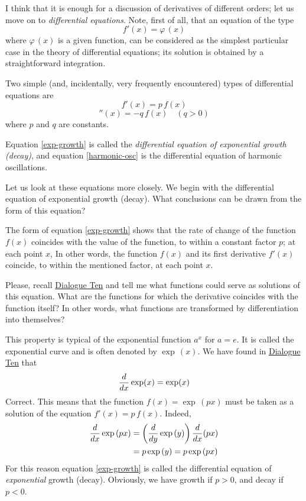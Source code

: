 I think that it is enough for a discussion of derivatives of different orders; let us move on to \emph{differential equations}. Note, first of all, that an equation of the type
\begin{equation}%
f' (x) = \varphi \, (x)
\label{diff-eq-1}
\end{equation}
where $\varphi \, (x)$ is a given function, can be considered as the simplest particular case in the theory of differential equations; its solution is obtained by a straightforward integration.

Two simple (and, incidentally, very frequently encountered) types of differential equations are
\begin{equation}%
\boxed{f' (x) = p \, f(x)}
\label{exp-growth}
\end{equation}
\begin{equation}%
\boxed{''(x)= - q\, f(x) \quad (q>0)}
\label{harmonic-osc}
\end{equation}
where $p$ and $q$ are constants.

Equation \eqref{exp-growth} is called the \emph{differential equation of exponential growth (decay)}, and equation \eqref{harmonic-osc} is the differential equation of harmonic oscillations.

Let us look at these equations more closely. We begin with the differential equation of exponential growth (decay). What conclusions can be drawn from the form of this equation?

\rdr The form of equation \eqref{exp-growth} shows that the rate of change of the function $f (x)$ coincides with the value of the function, to within a constant factor $p$; at each point $x$, In other words, the function $f (x)$ and its first derivative $f' (x)$ coincide, to within the mentioned factor, at each point $x$.

\athr Please, recall \hyperref[differentiation]{Dialogue Ten} and tell me what functions could serve as solutions of this equation. What are the functions for which the derivative coincides with the function itself? In other words, what functions are transformed by differentiation into themselves?

\rdr This property is typical of the exponential function $a^{x}$ for $a = e$. It is called the exponential curve and is often denoted by $\exp \, (x)$. We have found in \hyperref[differentiation]{Dialogue Ten}  that
\begin{equation*}%
\ddx \exp (x) =	\exp (x)
\end{equation*}
\athr Correct. This means that the function $f (x) = \exp \, (px)$ must be taken as a solution of the equation $f' (x) = p \, f (x)$. Indeed,
\begin{align*}%
\ddx \exp \, (px) & = \left( \dfrac{d}{dy} \exp \, (y) \right) \ddx (px) \\
& = p \exp \, (y) =p \exp \, (px)
\end{align*}
For this reason equation \eqref{exp-growth} is called the differential equation of \emph{exponential} growth (decay). Obviously, we have growth if $p > 0$, and decay if $p <0$.

